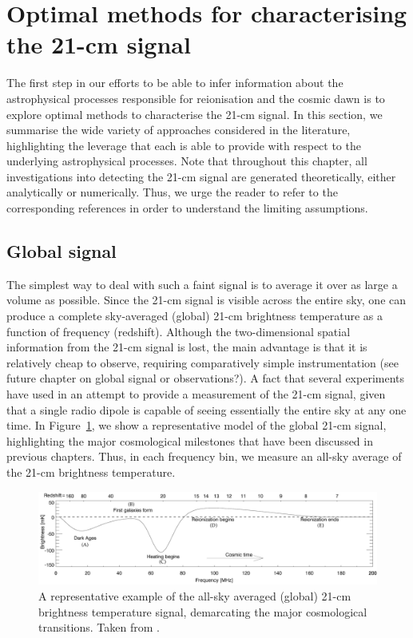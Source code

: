 \section{Optimal methods for characterising the 21-cm signal} \label{sec:methods}

The first step in our efforts to be able to infer information about the astrophysical processes responsible for reionisation and the cosmic dawn is to explore optimal methods to characterise the 21-cm signal. In this section, we summarise the wide variety of approaches considered in the literature, highlighting the leverage that each is able to provide with respect to the underlying astrophysical processes. Note that throughout this chapter, all investigations into detecting the 21-cm signal are generated theoretically, either analytically or numerically. Thus, we urge the reader to refer to the corresponding references in order to understand the limiting assumptions.

\subsection{Global signal} \label{sec:global}

The simplest way to deal with such a faint signal is to average it over as large a volume as possible. Since the 21-cm signal is visible across the entire sky, one can produce a complete sky-averaged (global) 21-cm brightness temperature as a function of frequency (redshift). Although the two-dimensional spatial information from the 21-cm signal is lost, the main advantage is that it is relatively cheap to observe, requiring comparatively simple instrumentation {\color{red} (see future chapter on global signal or observations?)}. A fact that several experiments have used in an attempt to provide a measurement of the 21-cm signal, given that a single radio dipole is capable of seeing essentially the entire sky at any one time. In Figure~\ref{fig:global}, we show a representative model of the global 21-cm signal, highlighting the major cosmological milestones that have been discussed in previous chapters. Thus, in each frequency bin, we measure an all-sky average of the 21-cm brightness temperature.

\begin{figure}[]
\begin{center}
\includegraphics[trim = 0.2cm 0.6cm 0.2cm 0.2cm, scale = 0.45]{Greig/GlobalSignal}
\end{center}
\caption{A representative example of the all-sky averaged (global) 21-cm brightness temperature signal, demarcating the major cosmological transitions. Taken from \cite{Pritchard:2012}.}
\label{fig:global}
\end{figure}

